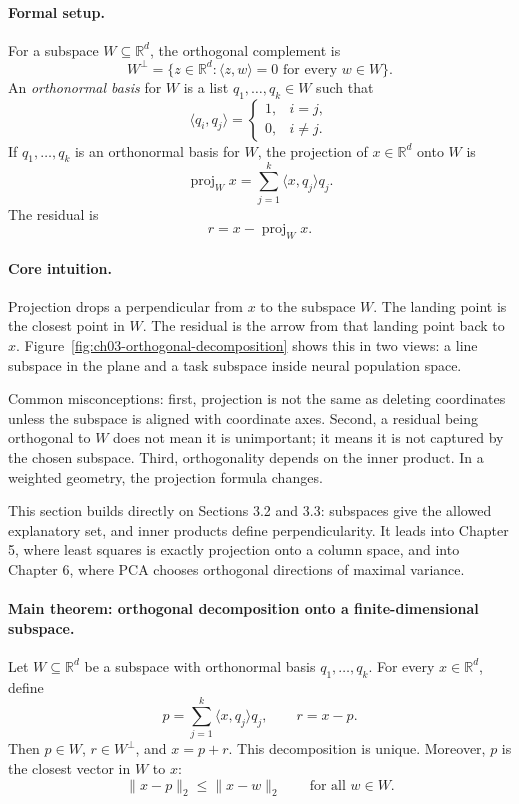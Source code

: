 \paragraph{Formal setup.}
For a subspace \(W\subseteq\mathbb{R}^d\), the orthogonal complement is
\[
W^\perp=\{z\in\mathbb{R}^d:\langle z,w\rangle=0\text{ for every }w\in W\}.
\]
An \emph{orthonormal basis} for \(W\) is a list \(q_1,\dots,q_k\in W\) such that
\[
\langle q_i,q_j\rangle=
\begin{cases}
1,& i=j,\\
0,& i\ne j.
\end{cases}
\]
If \(q_1,\dots,q_k\) is an orthonormal basis for \(W\), the projection of \(x\in\mathbb{R}^d\) onto \(W\) is
\[
\operatorname{proj}_W x=\sum_{j=1}^k \langle x,q_j\rangle q_j.
\]
The residual is
\[
r=x-\operatorname{proj}_W x.
\]

\paragraph{Core intuition.}
Projection drops a perpendicular from \(x\) to the subspace \(W\). The landing point is the closest point in \(W\). The residual is the arrow from that landing point back to \(x\). Figure~\ref{fig:ch03-orthogonal-decomposition} shows this in two views: a line subspace in the plane and a task subspace inside neural population space.

Common misconceptions: first, projection is not the same as deleting coordinates unless the subspace is aligned with coordinate axes. Second, a residual being orthogonal to \(W\) does not mean it is unimportant; it means it is not captured by the chosen subspace. Third, orthogonality depends on the inner product. In a weighted geometry, the projection formula changes.

This section builds directly on Sections 3.2 and 3.3: subspaces give the allowed explanatory set, and inner products define perpendicularity. It leads into Chapter 5, where least squares is exactly projection onto a column space, and into Chapter 6, where PCA chooses orthogonal directions of maximal variance.

\paragraph{Main theorem: orthogonal decomposition onto a finite-dimensional subspace.}
Let \(W\subseteq\mathbb{R}^d\) be a subspace with orthonormal basis \(q_1,\dots,q_k\). For every \(x\in\mathbb{R}^d\), define
\[
p=\sum_{j=1}^k \langle x,q_j\rangle q_j,
\qquad
r=x-p.
\]
Then \(p\in W\), \(r\in W^\perp\), and \(x=p+r\). This decomposition is unique. Moreover, \(p\) is the closest vector in \(W\) to \(x\):
\[
\|x-p\|_2\le \|x-w\|_2
\qquad\text{for all }w\in W.
\]

